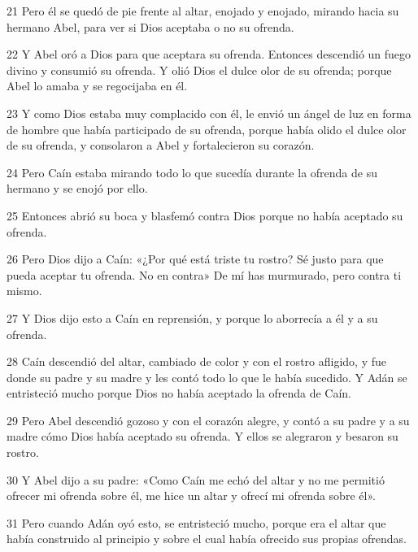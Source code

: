 \par 21 Pero él se quedó de pie frente al altar, enojado y enojado, mirando hacia su hermano Abel, para ver si Dios aceptaba o no su ofrenda.

\par 22 Y Abel oró a Dios para que aceptara su ofrenda. Entonces descendió un fuego divino y consumió su ofrenda. Y olió Dios el dulce olor de su ofrenda; porque Abel lo amaba y se regocijaba en él.

\par 23 Y como Dios estaba muy complacido con él, le envió un ángel de luz en forma de hombre que había participado de su ofrenda, porque había olido el dulce olor de su ofrenda, y consolaron a Abel y fortalecieron su corazón.

\par 24 Pero Caín estaba mirando todo lo que sucedía durante la ofrenda de su hermano y se enojó por ello.

\par 25 Entonces abrió su boca y blasfemó contra Dios porque no había aceptado su ofrenda.

\par 26 Pero Dios dijo a Caín: «¿Por qué está triste tu rostro? Sé justo para que pueda aceptar tu ofrenda. No en contra» De mí has ​​murmurado, pero contra ti mismo.

\par 27 Y Dios dijo esto a Caín en reprensión, y porque lo aborrecía a él y a su ofrenda.

\par 28 Caín descendió del altar, cambiado de color y con el rostro afligido, y fue donde su padre y su madre y les contó todo lo que le había sucedido. Y Adán se entristeció mucho porque Dios no había aceptado la ofrenda de Caín.

\par 29 Pero Abel descendió gozoso y con el corazón alegre, y contó a su padre y a su madre cómo Dios había aceptado su ofrenda. Y ellos se alegraron y besaron su rostro.

\par 30 Y Abel dijo a su padre: «Como Caín me echó del altar y no me permitió ofrecer mi ofrenda sobre él, me hice un altar y ofrecí mi ofrenda sobre él».

\par 31 Pero cuando Adán oyó esto, se entristeció mucho, porque era el altar que había construido al principio y sobre el cual había ofrecido sus propias ofrendas.

